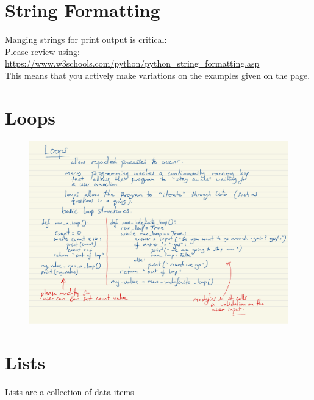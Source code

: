 \documentclass[a4paper,12pt]{article}
\begin{document}
\section{String Formatting}
Manging strings for print output is critical:\\

Please review using:\\
\url{https://www.w3schools.com/python/python_string_formatting.asp}\\
This means that you actively make variations on the examples given on the page.
\newpage
\section{Loops} 

\begin{figure}[!ht]
	\centering
	\includegraphics[width=16cm]{loops.pdf}
\end{figure}



\newpage
\section{Lists}
Lists are a collection of data items
\end{document}
